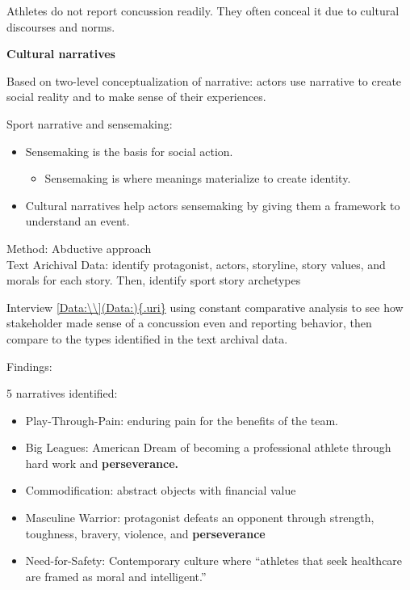 \documentclass[
]{book}
\providecommand{\tightlist}{%
  \setlength{\itemsep}{0pt}\setlength{\parskip}{0pt}}
\begin{document}
\citep{Zanin_2019}

Athletes do not report concussion readily. They often conceal it due to cultural discourses and norms.

\textbf{Cultural narratives}

Based on \citep{Polkinghorne_1995} two-level conceptualization of narrative: actors use narrative to create social reality
and to make sense of their experiences.

Sport narrative and sensemaking:

\begin{itemize}
\item
  Sensemaking is the basis for social action.

  \begin{itemize}
  \tightlist
  \item
    Sensemaking is where meanings materialize to create identity.
  \end{itemize}
\item
  Cultural narratives help actors sensemaking by giving them a framework to understand an event.
\end{itemize}

Method: Abductive approach\\
Text Arichival Data: identify protagonist, actors, storyline, story values, and morals for each story. Then, identify
sport story archetypes

Interview \href{\%5BData:\%5D(Data:)\%7B.uri\%7D}{{[}Data:\textbackslash\textbackslash{]}(Data:)\{.uri\}} using constant comparative analysis to see how
stakeholder made sense of a concussion even and reporting behavior, then compare to the types identified in the text
archival data.

Findings:

5 narratives identified:

\begin{itemize}
\tightlist
\item
  Play-Through-Pain: enduring pain for the benefits of the team.
\item
  Big Leagues: American Dream of becoming a professional athlete through hard work and \textbf{perseverance.}
\item
  Commodification: abstract objects with financial value
\item
  Masculine Warrior: protagonist defeats an opponent through strength, toughness, bravery, violence, and
  \textbf{perseverance}
\item
  Need-for-Safety: Contemporary culture where ``athletes that seek healthcare are framed as moral and intelligent.''
\end{itemize}
\end{document}
